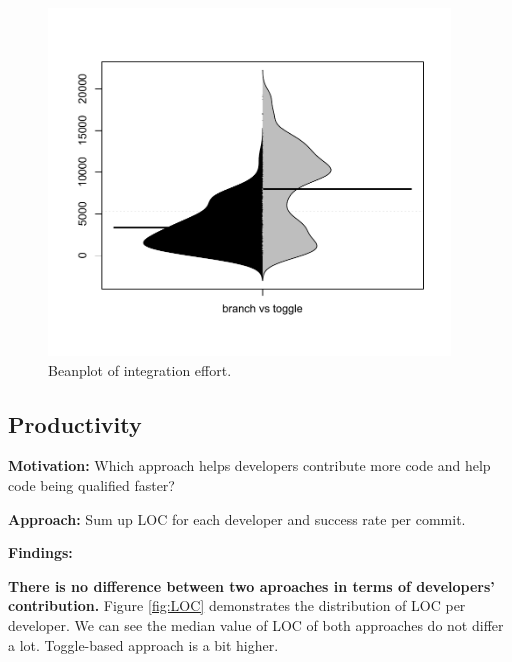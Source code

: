 \begin{figure}
\includegraphics[width=0.95\textwidth]{figure/beforeAfterIE.pdf}
\caption{Beanplot of integration effort.}
\label{fig:integrationEffort}
\end{figure}


\subsection{Productivity}

\textbf{Motivation:}
Which approach helps developers contribute more code and help code being qualified faster?

\textbf{Approach:}
Sum up LOC for each developer and success rate per commit.

\textbf{Findings:} 

\textbf{There is no difference between two aproaches in terms of developers' contribution.} Figure \ref{fig:LOC} demonstrates the distribution of LOC per developer. We can see the median value of LOC of both approaches do not differ a lot. Toggle-based approach is a bit higher.


